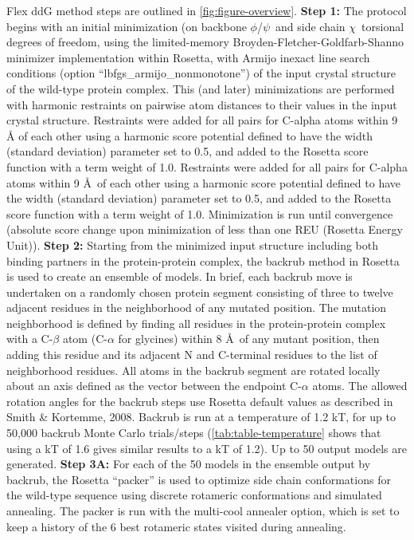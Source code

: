 Flex ddG method steps are outlined in \cref{fig:figure-overview}.
\textbf{Step 1:} The protocol begins with an initial minimization (on backbone $\phi$/$\psi$\ and side chain $\chi$\ torsional degrees of freedom, using the limited-memory Broyden-Fletcher-Goldfarb-Shanno minimizer implementation within Rosetta, with Armijo inexact line search conditions (option ``lbfgs\_armijo\_nonmonotone'') of the input crystal structure of the wild-type protein complex.
This (and later) minimizations are performed with harmonic restraints on pairwise atom distances to their values in the input crystal structure. Restraints were added for all pairs for C-alpha atoms within 9 Å of each other using a harmonic score potential defined to have the width (standard deviation) parameter set to 0.5, and added to the Rosetta score function with a term weight of 1.0.
Restraints were added for all pairs for C-alpha atoms within 9 \AA\ of each other using a harmonic score potential defined to have the width (standard deviation) parameter set to 0.5, and added to the Rosetta score function with a term weight of 1.0.
Minimization is run until convergence (absolute score change upon minimization of less than one REU (Rosetta Energy Unit)).
\textbf{Step 2:} Starting from the minimized input structure including both binding partners in the protein-protein complex, the backrub method in Rosetta\cite{smith_backrub-like_2008} is used to create an ensemble of models.
In brief, each backrub move is undertaken on a randomly chosen protein segment consisting of three to twelve adjacent residues in the neighborhood of any mutated position.
The mutation neighborhood is defined by finding all residues in the protein-protein complex with a C-$\beta$ atom (C-$\alpha$ for glycines) within 8 \AA\ of any mutant position, then adding this residue and its adjacent N and C-terminal residues to the list of neighborhood residues.
All atoms in the backrub segment are rotated locally about an axis defined as the vector between the endpoint C-$\alpha$ atoms.
The allowed rotation angles for the backrub steps use Rosetta default values as described in Smith \& Kortemme, 2008\cite{smith_backrub-like_2008}.
Backrub is run at a temperature of 1.2 kT, for up to 50,000 backrub Monte Carlo trials/steps (\cref{tab:table-temperature} shows that using a kT of 1.6 gives similar results to a kT of 1.2).
Up to 50 output models are generated.
\textbf{Step 3A:} For each of the 50 models in the ensemble output by backrub, the Rosetta ``packer'' is used to optimize side chain conformations for the wild-type sequence using discrete rotameric conformations \cite{shapovalov_smoothed_2011} and simulated annealing. The packer is run with the multi-cool annealer option\cite{leaver-fay_generic_2011}, which is set to keep a history of the 6 best rotameric states visited during annealing.
